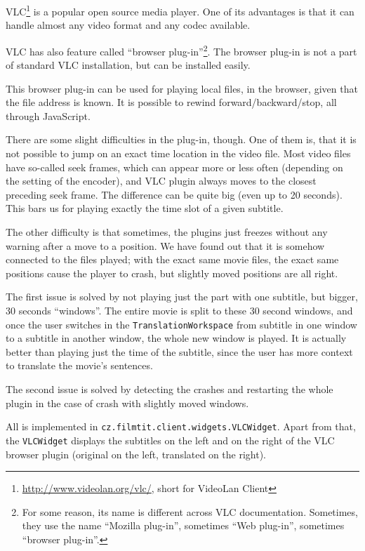 VLC\footnote{\url{http://www.videolan.org/vlc/}, short for VideoLan Client} is a popular open source media player. One of its advantages is that it can handle almost any video format and any codec available.

VLC has also feature called ``browser plug-in''\footnote{For some reason, its name is different across VLC documentation. Sometimes, they use the name ``Mozilla plug-in'', sometimes ``Web plug-in'', sometimes ``browser plug-in''.}. The browser plug-in is not a part of standard VLC installation, but can be installed easily.

This browser plug-in can be used for playing local files, in the browser, given that the file address is known. It is possible to rewind forward/backward/stop, all through JavaScript.

There are some slight difficulties in the plug-in, though. One of them is, that it is not possible to jump on an exact time location in the video file. Most video files have so-called seek frames, which can appear more or less often (depending on the setting of the encoder), and VLC plugin always moves to the closest preceding seek frame. The difference can be quite big (even up to 20 seconds). This bars us for playing exactly the time slot of a given subtitle.

The other difficulty is that sometimes, the plugins just freezes without any warning after a move to a position. We have found out that it is somehow connected to the files played; with the exact same movie files, the exact same positions cause the player to crash, but slightly moved positions are all right.

The first issue is solved by not playing just the part with one subtitle, but bigger, 30 seconds ``windows''. The entire movie is split to these 30 second windows, and once the user switches in the {\tt TranslationWorkspace} from subtitle in one window to a subtitle in another window, the whole new window is played. It is actually better than playing just the time of the subtitle, since the user has more context to translate the movie's sentences.

The second issue is solved by detecting the crashes and restarting the whole plugin in the case of crash with slightly moved windows.

All is implemented in \texttt{cz.filmtit.client.widgets.VLCWidget}. Apart from that, the \texttt{VLCWidget} displays the subtitles on the left and on the right of the VLC browser plugin (original on the left, translated on the right).

